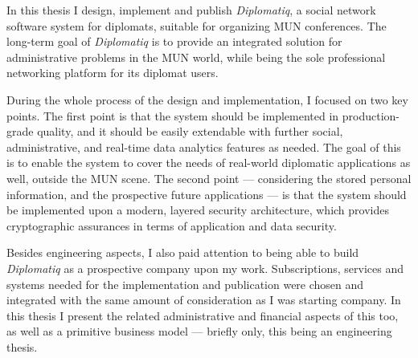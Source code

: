 In this thesis I design, implement and publish \emph{Diplomatiq}, a social network software system for diplomats, suitable for organizing MUN conferences. The long-term goal of \emph{Diplomatiq} is to provide an integrated solution for administrative problems in the MUN world, while being the sole professional networking platform for its diplomat users.

During the whole process of the design and implementation, I focused on two key points. The first point is that the system should be implemented in production-grade quality, and it should be easily extendable with further social, administrative, and real-time data analytics features as needed. The goal of this is to enable the system to cover the needs of real-world diplomatic applications as well, outside the MUN scene. The second point — considering the stored personal information, and the prospective future applications — is that the system should be implemented upon a modern, layered security architecture, which provides cryptographic assurances in terms of application and data security.

Besides engineering aspects, I also paid attention to being able to build \emph{Diplomatiq} as a prospective company upon my work. Subscriptions, services and systems needed for the implementation and publication were chosen and integrated with the same amount of consideration as I was starting company. In this thesis I present the related administrative and financial aspects of this too, as well as a primitive business model — briefly only, this being an engineering thesis.

